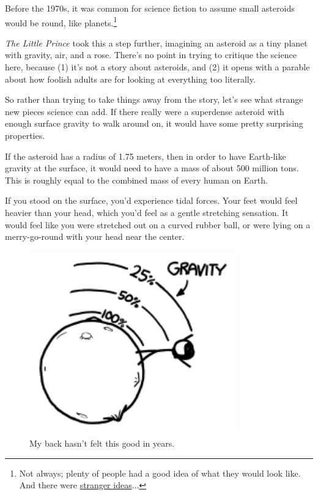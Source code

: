 {{Before the 1970s, it was common for science fiction to assume small asteroids would be round, like planets.{\footnote{Not always; plenty of people had a good idea of what they would look like. And there were \href{http://pencilink.blogspot.com/2010/08/uncle-scrooge-29-carl-barks-art-cover.html}{stranger ideas}...} } }

{ \emph{The Little Prince} took this a step further, imagining an asteroid as a tiny planet with gravity, air, and a rose. There's no point in trying to critique the science here, because (1) it's not a story about asteroids, and (2) it opens with a parable about how foolish adults are for looking at everything too literally.}

{So rather than trying to take things away from the story, let's see what strange new pieces science can add. If there really were a superdense asteroid with enough surface gravity to walk around on, it would have some pretty surprising properties.}

{If the asteroid has a radius of 1.75 meters, then in order to have Earth-like gravity at the surface, it would need to have a mass of about 500 million tons. This is roughly equal to the combined mass of every human on Earth.}

{If you stood on the surface, you'd experience tidal forces. Your feet would feel heavier than your head, which you'd feel as a gentle stretching sensation. It would feel like you were stretched out on a curved rubber ball, or were lying on a merry-go-round with your head near the center.}

\begin{figure}[!htbp]
\centering
\includegraphics[scale=0.5, max width=0.8\textwidth]{imgs/a/68/asteroid_tides.png}
\caption{My back hasn't felt this good in years.}
\end{figure}

}
